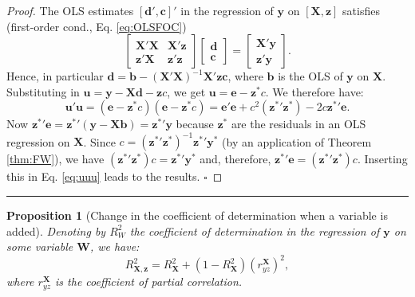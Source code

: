 \documentclass[
]{book}
\newtheorem{proposition}{Proposition}[chapter]
\theoremstyle{definition}
\theoremstyle{definition}
\theoremstyle{definition}
\theoremstyle{definition}
\theoremstyle{remark}
\begin{document}
\begin{proof}
The OLS estimates \([\mathbf{d}',\mathbf{c}]'\) in the regression of \(\mathbf{y}\) on \([\mathbf{X},\mathbf{z}]\) satisfies (first-order cond., Eq. \eqref{eq:OLSFOC})
\[
\left[ \begin{array}{cc} \mathbf{X}'\mathbf{X} & \mathbf{X}'\mathbf{z} \\ \mathbf{z}'\mathbf{X} & \mathbf{z}'\mathbf{z}\end{array}\right]
\left[ \begin{array}{c} \mathbf{d} \\ \mathbf{c}\end{array}\right] =
\left[ \begin{array}{c} \mathbf{X}' \mathbf{y} \\ \mathbf{z}' \mathbf{y} \end{array}\right].
\]
Hence, in particular \(\mathbf{d} = \mathbf{b} - (\mathbf{X}'\mathbf{X})^{-1}\mathbf{X}'\mathbf{z}\mathbf{c}\), where \(\mathbf{b}\) is the OLS of \(\mathbf{y}\) on \(\mathbf{X}\). Substituting in \(\mathbf{u} = \mathbf{y} - \mathbf{X}\mathbf{d} - \mathbf{z}c\), we get \(\mathbf{u} = \mathbf{e} - \mathbf{z}^*c\). We therefore have:
\begin{equation}
\mathbf{u}'\mathbf{u} = (\mathbf{e} - \mathbf{z}^*c)(\mathbf{e} - \mathbf{z}^*c)= \mathbf{e}'\mathbf{e} + c^2(\mathbf{z^*}'\mathbf{z^*}) - 2 c\mathbf{z^*}'\mathbf{e}.\label{eq:uuu}
\end{equation}
Now \(\mathbf{z^*}'\mathbf{e} = \mathbf{z^*}'(\mathbf{y} - \mathbf{X}\mathbf{b}) = \mathbf{z^*}'\mathbf{y}\) because \(\mathbf{z}^*\) are the residuals in an OLS regression on \(\mathbf{X}\). Since \(c = (\mathbf{z^*}'\mathbf{z^*})^{-1}\mathbf{z^*}'\mathbf{y^*}\) (by an application of Theorem \ref{thm:FW}), we have \((\mathbf{z^*}'\mathbf{z^*})c = \mathbf{z^*}'\mathbf{y^*}\) and, therefore, \(\mathbf{z^*}'\mathbf{e} = (\mathbf{z^*}'\mathbf{z^*})c\). Inserting this in Eq. \eqref{eq:uuu} leads to the results. \(\square\)
\end{proof}

\begin{center}\rule{0.5\linewidth}{0.5pt}\end{center}

\begin{proposition}[Change in the coefficient of determination when a variable is added]
\protect\hypertarget{prp:chgeInR2}{}\label{prp:chgeInR2}Denoting by \(R_W^2\) the coefficient of determination in the regression of \(\mathbf{y}\) on some variable \(\mathbf{W}\), we have:
\[
R_{\mathbf{X},\mathbf{z}}^2 = R_{\mathbf{X}}^2 + (1-R_{\mathbf{X}}^2)(r_{yz}^\mathbf{X})^2,
\]
where \(r_{yz}^\mathbf{X}\) is the coefficient of partial correlation.
\end{proposition}
\end{document}
